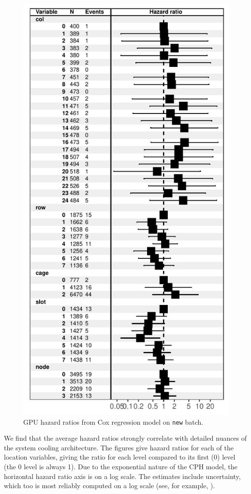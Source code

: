 \begin{figure}
  \centering
  \includegraphics[width=0.8\columnwidth]{figs/cox_n001.pdf}
  \caption{GPU hazard ratios from Cox regression model on {\tt new}
    batch.}
  \label{fig:cox-new}
\end{figure}

We find that the average hazard ratios strongly correlate with
detailed nuances of the system cooling architecture.  The figures give
hazard ratios for each of the location variables, giving the ratio for
each level compared to its first (0) level (the 0 level is always
1). Due to the exponential nature of the CPH model, the horizontal
hazard ratio axis is on a log scale. The estimates include
uncertainty, which too is most reliably computed on a log scale (see,
for example, \cite{Ostrouchov88}).
